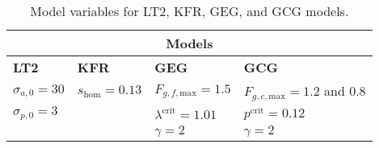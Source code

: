 \restoregeometry
\begin{table}[htbp]
    \centering
    \begin{tabular}{|l|l|l|l|}
        \hline
        \multicolumn{4}{|c|}{\textbf{Models}} \\
        \hline
        \textbf{LT2} & \textbf{KFR} & \textbf{GEG} & \textbf{GCG} \\
        \hline
        $\sigma_{a,0} = 30$ & $s_\mathrm{hom} = 0.13$ & $F_{g,f,\mathrm{max}}=1.5$ & $F_{g,c,\mathrm{max}}=1.2$ and $0.8$\\
        $\sigma_{p,0} = 3$ & & $\lambda^\mathrm{crit}=1.01$ & $p^\mathrm{crit}=0.12$ \\
        & & $\gamma = 2$ & $\gamma = 2$\\
        \hline
    \end{tabular}
    \caption{Model variables for LT2, KFR, GEG, and GCG models.}
    \label{tab:variables1}
\end{table}
    
